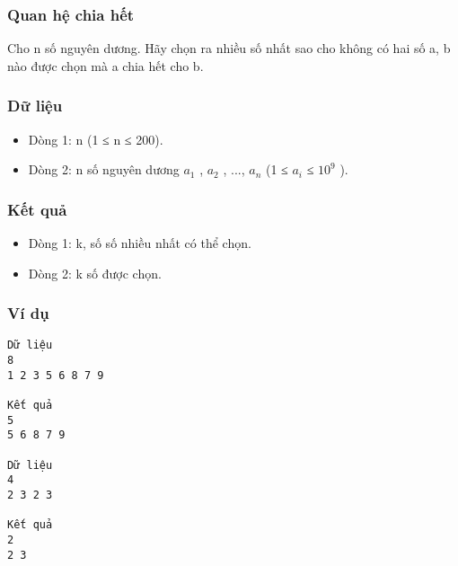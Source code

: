 



\subsubsection{   Quan hệ chia hết  }

   Cho n số nguyên dương. Hãy chọn ra nhiều số nhất sao cho không có hai số a, b nào được chọn mà a chia hết cho b.  

\subsubsection{   Dữ liệu  }
\begin{itemize}
	\item     Dòng 1: n (1 ≤ n ≤ 200).   
	\item     Dòng 2: n số nguyên dương $a_{1}$    , $a_{2}$    , ..., $a_{n}$    (1 ≤ $a_{i}$    ≤ $10^{9}$    ).   
\end{itemize}

\subsubsection{   Kết quả  }
\begin{itemize}
	\item     Dòng 1: k, số số nhiều nhất có thể chọn.   
	\item     Dòng 2: k số được chọn.   
\end{itemize}

\subsubsection{   Ví dụ  }
\begin{verbatim}
Dữ liệu
8
1 2 3 5 6 8 7 9

Kết quả
5
5 6 8 7 9

Dữ liệu
4
2 3 2 3

Kết quả
2
2 3
\end{verbatim}
